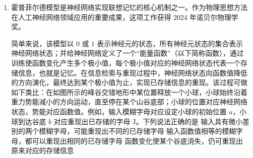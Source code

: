 \documentclass[\gkver]{gaokaozhenti}
\begin{document}
\begin{enumerate}
{D．该光电导效应仅在半导体内部激发自由载流子，不存在逸出半导体的光电子。当半导体两端电压为 $0$ 时，内部没有外电场驱动自由载流子定向移动，因此电流表示数为 $0$，故 D 错误，符合题意。

故选 D。
}
\item
霍普菲尔德模型是神经网络实现联想记忆的核心机制之一。作为物理思想方法在人工神经网络领域应用的重要成果，这项工作获得 2024 年诺贝尔物理学奖。

简单来说，该模型以 $0$ 或 $1$ 表示神经元的状态，所有神经元状态的集合表示神经网络状态；并给神经网络定义了一个“能量函数”（以下简称函数），通过训练使函数变化产生多个极小值，每个极小值对应的神经网络状态代表一个存储信息，也就是记忆。在信息检索与重现过程中，神经网络状态向函数值降低的方向演化，最终达到某个极小值为止，实现已存储信息的重现。该过程可做如下类比：在如图所示的峰谷交错地形中某位置释放一个小球，小球始终沿着重力势能减小的方向运动，直至停在某个山谷底部；小球的位置对应神经网络状态，势能对应函数值。例如，输入模糊字母对应设定小球的初始位置 $a$，小球到达谷底 $b$ 对应重现出已存储的字母 J。下列说法正确的是 
\onepicture[w=9.5cm]{}
{输入具有微小差别的两个模糊字母，可能重现出不同的已存储字母}
{输入函数值相等的模糊字母，都可以重现出相同的已存储字母}
{函数变化使某个谷底消失，仍可重现出原来对应的存储信息}

\end{enumerate}
\end{document}
